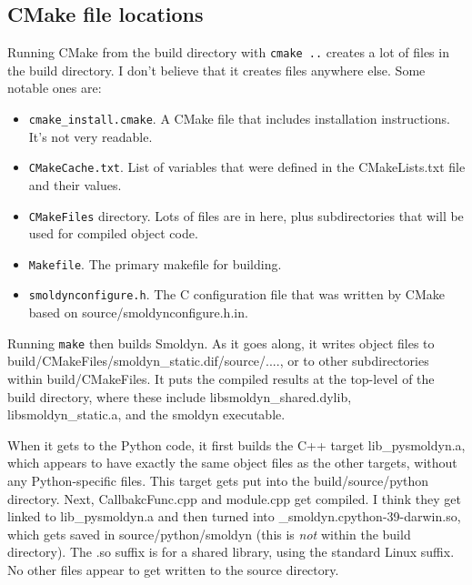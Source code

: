 \documentclass {scrbook}
\newcommand {\ttt} {\texttt}
\begin{document}
\subsection{CMake file locations}

Running CMake from the build directory with \ttt{cmake ..} creates a lot of files in the build directory. I don't believe that it creates files anywhere else. Some notable ones are:
\begin{itemize}
\item \ttt{cmake\_install.cmake}. A CMake file that includes installation instructions. It's not very readable.
\item \ttt{CMakeCache.txt}. List of variables that were defined in the CMakeLists.txt file and their values.
\item \ttt{CMakeFiles} directory. Lots of files are in here, plus subdirectories that will be used for compiled object code.
\item \ttt{Makefile}. The primary makefile for building.
\item \ttt{smoldynconfigure.h}. The C configuration file that was written by CMake based on source/smoldynconfigure.h.in.
\end{itemize}

Running \ttt{make} then builds Smoldyn. As it goes along, it writes object files to build/CMakeFiles/smoldyn\_static.dif/source/...., or to other subdirectories within build/CMakeFiles. It puts the compiled results at the top-level of the build directory, where these include libsmoldyn\_shared.dylib, libsmoldyn\_static.a, and the smoldyn executable.

When it gets to the Python code, it first builds the C++ target lib\_pysmoldyn.a, which appears to have exactly the same object files as the other targets, without any Python-specific files. This target gets put into the build/source/python directory. Next, CallbakcFunc.cpp and module.cpp get compiled. I think they get linked to lib\_pysmoldyn.a and then turned into \_smoldyn.cpython-39-darwin.so, which gets saved in source/python/smoldyn (this is \textit{not} within the build directory). The .so suffix is for a shared library, using the standard Linux suffix. No other files appear to get written to the source directory.
\end{document}
